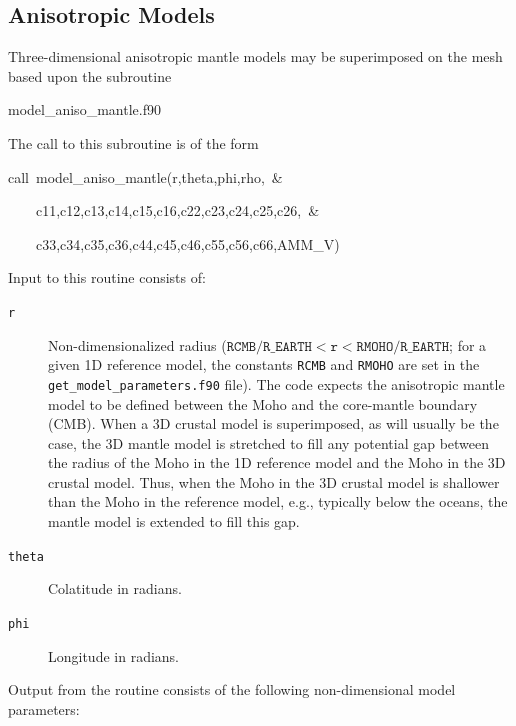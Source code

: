 \documentclass[oneside,english]{book}
\newenvironment{lyxcode}
{\begin{list}{}{
\setlength{\rightmargin}{\leftmargin}
\setlength{\listparindent}{0pt}%
\raggedright
\setlength{\itemsep}{0pt}
\setlength{\parsep}{0pt}
\normalfont\ttfamily}%
 \item[]}
{\end{list}}
\begin{document}
\subsection{{\normalsize \label{sub:Anisotropic-Models}Anisotropic Models}}

Three-dimensional anisotropic mantle models may be superimposed on
the mesh based upon the subroutine

\begin{lyxcode}
model\_aniso\_mantle.f90
\end{lyxcode}
The call to this subroutine is of the form

\begin{lyxcode}
call~model\_aniso\_mantle(r,theta,phi,rho,~\&~

~~~~c11,c12,c13,c14,c15,c16,c22,c23,c24,c25,c26,~\&~

~~~~c33,c34,c35,c36,c44,c45,c46,c55,c56,c66,AMM\_V)~
\end{lyxcode}
Input to this routine consists of:

\begin{description}
\item [{\texttt{r}}] Non-dimensionalized radius ($\texttt{RCMB/R\_ EARTH}<\texttt{r}<\texttt{RMOHO/R\_ EARTH}$;
for a given 1D reference model, the constants \texttt{RCMB} and \texttt{RMOHO}
are set in the \texttt{\small get\_model\_parameters}\texttt{.f90}
file). The code expects the anisotropic mantle model to be defined
between the Moho and the core-mantle boundary (CMB). When a 3D crustal
model is superimposed, as will usually be the case, the 3D mantle
model is stretched to fill any potential gap between the radius of
the Moho in the 1D reference model and the Moho in the 3D crustal
model. Thus, when the Moho in the 3D crustal model is shallower than
the Moho in the reference model, e.g., typically below the oceans,
the mantle model is extended to fill this gap.
\item [{\texttt{theta}}] Colatitude in radians.
\item [{\texttt{phi}}] Longitude in radians.
\end{description}
Output from the routine consists of the following non-dimensional
model parameters:
\end{document}
